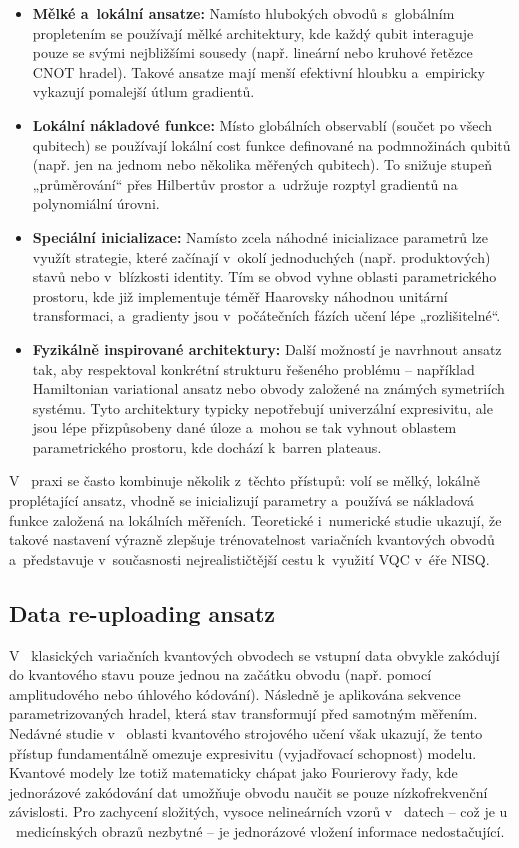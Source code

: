 \documentclass[12pt, a4paper]{report}
\begin{document}
\begin{itemize}
    \item \textbf{Mělké a~lokální ansatze:} Namísto hlubokých obvodů s~globálním propletením se používají mělké architektury, kde každý qubit interaguje pouze se svými nejbližšími sousedy (např. lineární nebo kruhové řetězce CNOT hradel). Takové ansatze mají menší efektivní hloubku a~empiricky vykazují pomalejší útlum gradientů.
    \item \textbf{Lokální nákladové funkce:} Místo globálních observablí (součet po všech qubitech) se používají lokální cost funkce definované na podmnožinách qubitů (např. jen na jednom nebo několika měřených qubitech). To snižuje stupeň „průměrování“ přes Hilbertův prostor a~udržuje rozptyl gradientů na polynomiální úrovni.
    \item \textbf{Speciální inicializace:} Namísto zcela náhodné inicializace parametrů lze využít strategie, které začínají v~okolí jednoduchých (např. produktových) stavů nebo v~blízkosti identity. Tím se obvod vyhne oblasti parametrického prostoru, kde již implementuje téměř Haarovsky náhodnou unitární transformaci, a~gradienty jsou v~počátečních fázích učení lépe „rozlišitelné“.
    \item \textbf{Fyzikálně inspirované architektury:} Další možností je navrhnout ansatz tak, aby respektoval konkrétní strukturu řešeného problému – například Hamiltonian variational ansatz nebo obvody založené na známých symetriích systému. Tyto architektury typicky nepotřebují univerzální expresivitu, ale jsou lépe přizpůsobeny dané úloze a~mohou se tak vyhnout oblastem parametrického prostoru, kde dochází k~barren plateaus.
\end{itemize}

V ~praxi se často kombinuje několik z~těchto přístupů: volí se mělký, lokálně proplétající ansatz, vhodně se inicializují parametry a~používá se nákladová funkce založená na lokálních měřeních. Teoretické i~numerické studie ukazují, že takové nastavení výrazně zlepšuje trénovatelnost variačních kvantových obvodů a~představuje v~současnosti nejrealističtější cestu k~využití VQC v~éře NISQ.

\subsection{Data re-uploading ansatz} \label{subsec:data_reuploading}

V ~klasických variačních kvantových obvodech se vstupní data obvykle zakódují do kvantového stavu pouze jednou na začátku obvodu (např. pomocí amplitudového nebo úhlového kódování). Následně je aplikována sekvence parametrizovaných hradel, která stav transformují před samotným měřením. Nedávné studie v ~oblasti kvantového strojového učení však ukazují, že tento přístup fundamentálně omezuje expresivitu (vyjadřovací schopnost) modelu. Kvantové modely lze totiž matematicky chápat jako Fourierovy řady, kde jednorázové zakódování dat umožňuje obvodu naučit se pouze nízkofrekvenční závislosti. Pro zachycení složitých, vysoce nelineárních vzorů v ~datech – což je u ~medicínských obrazů nezbytné – je jednorázové vložení informace nedostačující.
\end{document}
